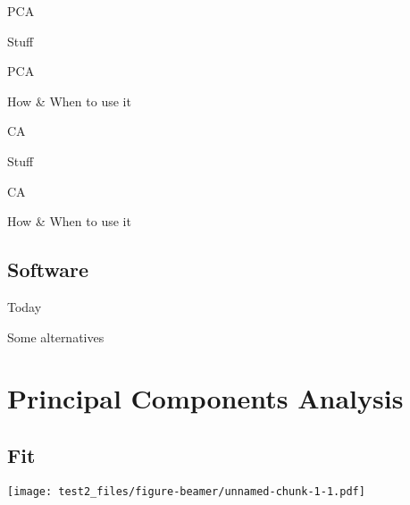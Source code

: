 \documentclass[
  ignorenonframetext,
]{beamer}
\begin{document}
\begin{frame}{PCA}
\protect\hypertarget{pca}{}

Stuff

\end{frame}

\begin{frame}{PCA}
\protect\hypertarget{pca-1}{}

How \& When to use it

\end{frame}

\begin{frame}{CA}
\protect\hypertarget{ca}{}

Stuff

\end{frame}

\begin{frame}{CA}
\protect\hypertarget{ca-1}{}

How \& When to use it

\end{frame}

\hypertarget{software}{%
\subsection{Software}\label{software}}

\begin{frame}{Today}
\protect\hypertarget{today}{}

\end{frame}

\begin{frame}{Some alternatives}
\protect\hypertarget{some-alternatives}{}

\end{frame}

\hypertarget{principal-components-analysis}{%
\section{Principal Components
Analysis}\label{principal-components-analysis}}

\hypertarget{fit}{%
\subsection{Fit}\label{fit}}

\begin{frame}

\texttt{[image: test2\_files/figure-beamer/unnamed-chunk-1-1.pdf]}

\end{frame}
\end{document}
